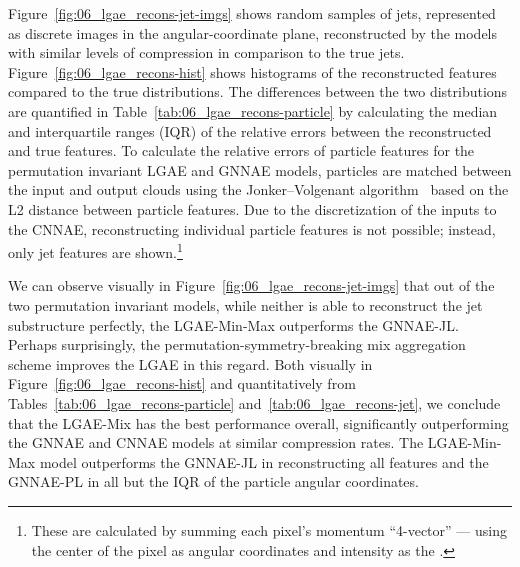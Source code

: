 Figure~\ref{fig:06_lgae_recons-jet-imgs} shows random samples of jets, represented as discrete images in the angular-coordinate plane, reconstructed by the models with similar levels of compression in comparison to the true jets.
Figure~\ref{fig:06_lgae_recons-hist} shows histograms of the reconstructed features compared to the true distributions.
The differences between the two distributions are quantified in Table~\ref{tab:06_lgae_recons-particle} by calculating the median and interquartile ranges (IQR) of the relative errors between the reconstructed and true features.
To calculate the relative errors of particle features for the permutation invariant LGAE and GNNAE models, particles are matched between the input and output clouds using the Jonker–Volgenant algorithm~\cite{JonkerVolgenant,2020SciPy-NMeth} based on the L2 distance between particle features.
Due to the discretization of the inputs to the CNNAE, reconstructing individual particle features is not possible; instead, only jet features are shown.\footnote{These are calculated by summing each pixel's momentum ``4-vector'' --- using the center of the pixel as angular coordinates and intensity as the \ptrel.}

We can observe visually in Figure~\ref{fig:06_lgae_recons-jet-imgs} that out of the two permutation invariant models, while neither is able to reconstruct the jet substructure perfectly,
the LGAE-Min-Max outperforms the GNNAE-JL.
Perhaps surprisingly, the permutation-symmetry-breaking mix aggregation scheme improves the LGAE in this regard.
Both visually in Figure~\ref{fig:06_lgae_recons-hist} and quantitatively from Tables~\ref{tab:06_lgae_recons-particle} and~\ref{tab:06_lgae_recons-jet}, we conclude that the LGAE-Mix has the best performance overall, significantly outperforming the GNNAE and CNNAE models at similar compression rates. 
The LGAE-Min-Max model outperforms the GNNAE-JL in reconstructing all features and the GNNAE-PL in all but the IQR of the particle angular coordinates.

